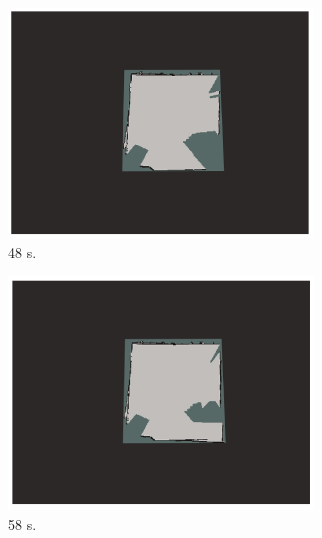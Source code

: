 \documentclass[11pt,openany]{book}
\begin{document}
\begin{figure}[H]
\begin{subfigure}[H]{0.3\linewidth}
        \includegraphics[width=\linewidth]{assets/4_12_e.png}
        \caption{{48 s.}}
        \label{fig:4.12e}
    \end{subfigure}
    \begin{subfigure}[H]{0.3\linewidth}
        \includegraphics[width=\linewidth]{assets/4_12_f.png}
        \caption{{58 s.}}
        \label{fig:4.12f}
    \end{subfigure}
    \begin{subfigure}[H]{0.3\linewidth}

\end{subfigure}
\end{figure}
\end{document}
